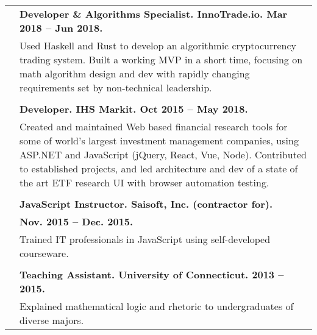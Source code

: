 \documentclass{article}
\begin{document}
\begin{tabular}{rl}
  & {\bf Developer \& Algorithms Specialist. InnoTrade.io. Mar 2018 -- Jun 2018.} \\
  & \parbox{4.5in}{Used Haskell and Rust to develop an algorithmic cryptocurrency trading system. Built a working MVP in a short time, focusing on math algorithm design and dev with rapidly changing requirements set by non-technical leadership.} \\ \\

  & {\bf Developer. IHS Markit. Oct 2015 -- May 2018.} \\
  & \parbox{4.5in}{Created and maintained Web based financial research tools for some of world's largest investment management companies, using ASP.NET and JavaScript (jQuery, React, Vue, Node). Contributed to established projects, and led architecture and dev of a state of the art ETF research UI with browser automation testing.} \\ \\

  & {\bf JavaScript Instructor. Saisoft, Inc. (contractor for).} \\ & {\bf Nov. 2015 -- Dec. 2015.} \\
  & \parbox{4.5in}{Trained IT professionals in JavaScript using self-developed courseware.} \\ \\

  & {\bf Teaching Assistant. University of Connecticut. 2013 -- 2015.} \\
  & \parbox{4.5in}{Explained mathematical logic and rhetoric to undergraduates of diverse majors.}
\end{tabular}
\end{document}
